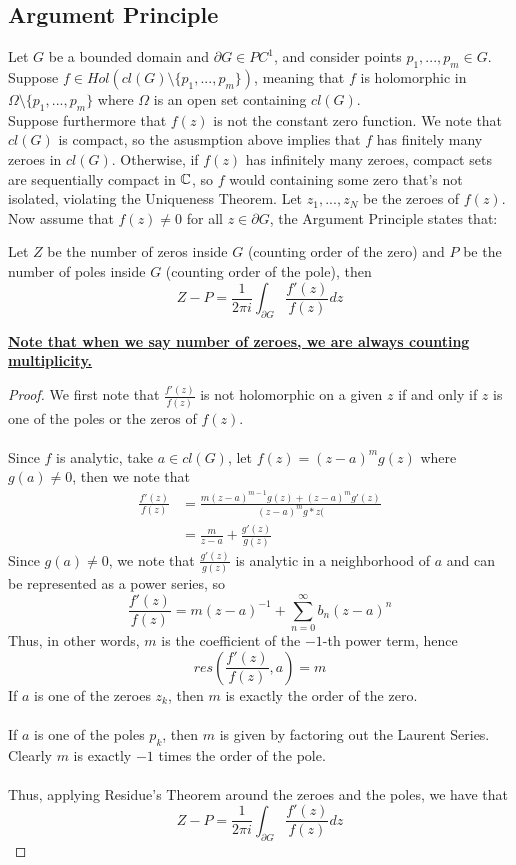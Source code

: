 \documentclass{article}
\begin{document}
\subsection{Argument Principle}

Let $G$ be a bounded domain and $\partial G \in PC^1$, and consider points $p_1, ..., p_m \in G$. Suppose $f \in Hol(cl(G) \setminus \{p_1, ..., p_m\})$, meaning that $f$ is holomorphic in $\Omega \setminus \{p_1, ..., p_m\}$ where $\Omega$ is an open set containing $cl(G)$.\\

Suppose furthermore that $f(z)$ is not the constant zero function. We note that $cl(G)$ is compact, so the asusmption above implies that $f$ has finitely many zeroes in $cl(G)$. Otherwise, if $f(z)$ has infinitely many zeroes, compact sets are sequentially compact in $\mathbb{C}$, so $f$ would containing some zero that's not isolated, violating the Uniqueness Theorem. Let $z_1, ..., z_N$ be the zeroes of $f(z)$.\\

Now assume that $f(z) \neq 0$ for all $z \in \partial G$, the Argument Principle states that:

\begin{theorem}
Let $Z$ be the number of zeros inside $G$ (counting order of the zero) and $P$ be the number of poles inside $G$ (counting order of the pole), then
\[Z - P = \frac{1}{2\pi i} \int_{\partial G} \frac{f'(z)}{f(z)} dz\]
\end{theorem}

\underline{\textbf{Note that when we say number of zeroes, we are always counting multiplicity.}}

\begin{proof}
We first note that $\frac{f'(z)}{f(z)}$ is not holomorphic on a given $z$ if and only if $z$ is one of the poles or the zeros of $f(z)$.\\\\
Since $f$ is analytic, take $a \in cl(G)$, let $f(z) = (z - a)^m g(z)$ where $g(a) \neq 0$, then we note that
\begin{align*}
    \frac{f'(z)}{f(z)} &= \frac{m(z - a)^{m-1} g(z) + (z-a)^m g'(z)}{(z - a)^m g*z(}\\
    &= \frac{m}{z - a} + \frac{g'(z)}{g(z)}
\end{align*}
Since $g(a) \neq 0$, we note that $\frac{g'(z)}{g(z)}$ is analytic in a neighborhood of $a$ and can be represented as a power series, so
\[\frac{f'(z)}{f(z)} = m(z - a)^{-1} + \sum_{n = 0}^\infty b_n (z - a)^n\]
Thus, in other words, $m$ is the coefficient of the $-1$-th power term, hence
\[res(\frac{f'(z)}{f(z)}, a) = m\]
If $a$ is one of the zeroes $z_k$, then $m$ is exactly the order of the zero.\\\\
If $a$ is one of the poles $p_k$, then $m$ is given by factoring out the Laurent Series. Clearly $m$ is exactly $-1$ times the order of the pole.\\\\
Thus, applying Residue's Theorem around the zeroes and the poles, we have that
\[Z - P = \frac{1}{2\pi i} \int_{\partial G} \frac{f'(z)}{f(z)} dz\]
\end{proof}
\end{document}
